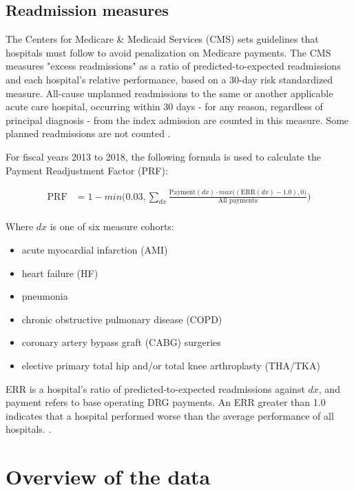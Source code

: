 \documentclass[12pt]{ociamthesis}\usepackage[]{graphicx}\usepackage[]{color}
\begin{document}
\subsection{Readmission measures}

The Centers for Medicare \& Medicaid Services (CMS) sets guidelines that hospitals must follow to avoid penalization on Medicare payments. 
The CMS measures "excess readmissions" as a ratio of predicted-to-expected readmissions and each hospital's relative performance, based on
a 30-day risk standardized measure. All-cause unplanned readmissions to the same or another applicable acute care hospital, 
occurring within 30 days - for any reason, regardless of principal diagnosis - from the index admission are counted in this measure.
Some planned readmissions are not counted \cite{HRRP}. 

For fiscal years 2013 to 2018, the following formula is used to calculate the Payment Readjustment Factor (PRF):

\begin{equation} \label{prf}
\begin{split}
  \text{PRF} &= 1 - min\bigg(0.03, \sum_{dx} \frac{\text{Payment}(dx) \cdot max\big((\text{ERR}(dx) - 1.0), 0\big)}{\text{All payments}}\bigg) \\
\end{split}
\end{equation}
 
Where $dx$ is one of six measure cohorts: 

\begin{itemize}
  \item acute myocardial infarction (AMI)
  \item heart failure (HF)
  \item pneumonia
  \item chronic obstructive pulmonary disease (COPD)
  \item coronary artery bypass graft (CABG) surgeries
  \item elective primary total hip and/or total knee arthroplasty (THA/TKA)
\end{itemize}

ERR is a hospital's ratio of predicted-to-expected readmissions against $dx$, and payment refers to base operating DRG payments.
An ERR greater than 1.0 indicates that a hospital performed worse than the average performance of all hospitals. \cite{HRRPPaymentAdjustment, Lessa2015}.


\section{Overview of the data}
\end{document}
